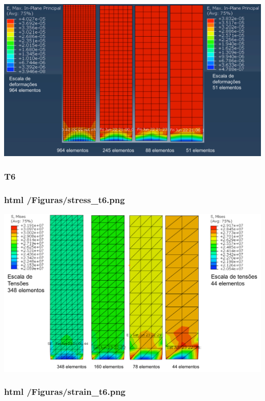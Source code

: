 \begin{DoxyImageNoCaption}
  \mbox{\includegraphics[width=\textwidth,height=\textheight/2,keepaspectratio=true]{strain.png}}
\end{DoxyImageNoCaption}
 

\subsubsection*{T6}

\subsubsection*{html /\+Figuras/stress\+\_\+t6.png}


\begin{DoxyImageNoCaption}
  \mbox{\includegraphics[width=\textwidth,height=\textheight/2,keepaspectratio=true]{stress_t6.png}}
\end{DoxyImageNoCaption}
 

\subsubsection*{html /\+Figuras/strain\+\_\+t6.png}


